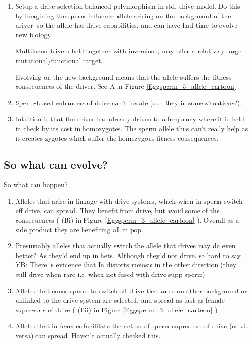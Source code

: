 \documentclass[12pt,letterpaper]{article}
\begin{document}
\begin{enumerate}
\item Setup a drive-selection balanced polymorphism in std. drive model. 
Do this by imagining the sperm-influence allele arising on the background of the driver, 
so the allele has drive capabilities, and can have had time to evolve new biology. 

Multilocus drivers held together with inversions, may offer a relatively large mutational/functional target.

Evolving on the new background means that the allele suffers the fitness consequences of the 
driver.  See A in Figure \ref{Eggsperm_3_allele_cartoon} \\
\item Sperm-based enhancers of drive can't invade (can they in some situations?). \\
\item Intuition is that the driver has already driven to a frequency 
where it is held in check by its cost in homozygotes. The sperm allele 
thus can't really help as it creates zygotes which suffer the homozygous fitness consequences.
\end{enumerate}

\subsection{So what can evolve?}
So what can happen?
\begin{enumerate}
\item Alleles that arise in linkage with drive systems, which when in sperm switch off drive, 
can spread. They benefit from drive, but avoid some of the
consequences ( (Bi) in Figure \ref{Eggsperm_3_allele_cartoon} ). Overall as a side product they are benefiting all in pop.\\
\item Presumably alleles that actually switch the allele that drives may do even better? As they'd end up in 
hets. Although they'd not drive, so hard to say. YB: There is evidence that In distorts meiosis in the other direction (they still drive when rare i.e. when not fused with drive supp sperm) \\
\item Alleles that cause sperm to switch off drive that arise on other background or unlinked to the drive system
are selected, and spread as fast as female supressors of drive ( (Bii) in Figure \ref{Eggsperm_3_allele_cartoon} )..\\
\item Alleles that in females facilitate the action of sperm supressors of drive (or vis versa) can spread. Haven't actually checked this.\\
\end{enumerate}
\end{document}
